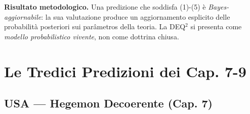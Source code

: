\Proved{} \textbf{Risultato metodologico.} Una predizione che soddisfa
(1)-(5) è \emph{Bayes-aggiornabile}: la sua valutazione produce un
aggiornamento esplicito delle probabilità posteriori sui parâmetros della
teoria. La DEQ$^2$ si presenta come \emph{modello probabilistico vivente},
non come dottrina chiusa.



\section{Le Tredici Predizioni dei Cap.
7-9}\label{le-tredici-predizioni-dei-cap.-7-9}

\subsection{USA --- Hegemon Decoerente (Cap.
7)}\label{usa-egemone-decoerente-cap.-7}

